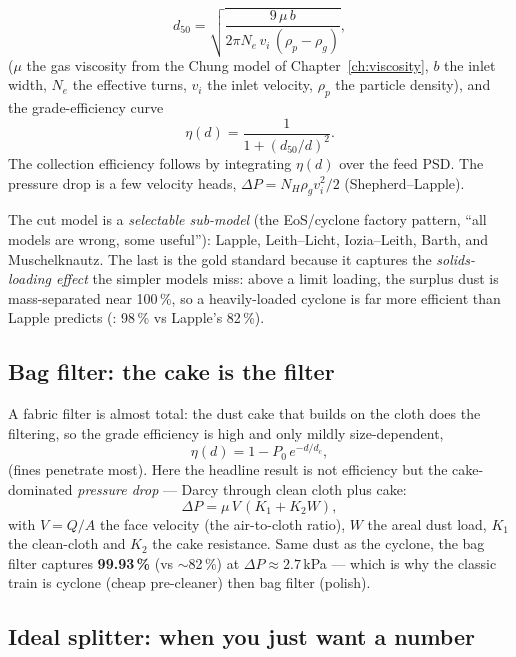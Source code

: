 \documentclass[11pt,a4paper]{article}
\begin{document}
\begin{equation}
   d_{50} = \sqrt{\frac{9\,\mu\,b}{2\pi N_e\, v_i\,(\rho_p - \rho_g)}},
\end{equation}
($\mu$ the gas viscosity from the Chung model of
Chapter~\ref{ch:viscosity}, $b$ the inlet width, $N_e$ the effective
turns, $v_i$ the inlet velocity, $\rho_p$ the particle density), and
the grade-efficiency curve
\begin{equation}
   \eta(d) = \frac{1}{1 + (d_{50}/d)^2}.
\end{equation}
The collection efficiency follows by integrating $\eta(d)$ over the
feed PSD.  The pressure drop is a few velocity heads, $\Delta P = N_H
\rho_g v_i^2/2$ (Shepherd--Lapple).

The cut model is a \emph{selectable sub-model} (the EoS/cyclone factory
pattern, ``all models are wrong, some useful''): Lapple, Leith--Licht,
Iozia--Leith, Barth, and Muschelknautz.  The last is the gold standard
because it captures the \emph{solids-loading effect} the simpler models
miss: above a limit loading, the surplus dust is mass-separated near
100\,\%, so a heavily-loaded cyclone is far more efficient than Lapple
predicts (: 98\,\% vs Lapple's 82\,\%).

\subsection{Bag filter: the cake is the filter}

A fabric filter is almost total: the dust cake that builds on the cloth
does the filtering, so the grade efficiency is high and only mildly
size-dependent,
\begin{equation}
   \eta(d) = 1 - P_0\,e^{-d/d_c},
\end{equation}
(fines penetrate most).  Here the headline result is not efficiency but
the cake-dominated \emph{pressure drop} --- Darcy through clean cloth
plus cake:
\begin{equation}
   \Delta P = \mu\,V\,(K_1 + K_2 W),
\end{equation}
with $V = Q/A$ the face velocity (the air-to-cloth ratio), $W$ the
areal dust load, $K_1$ the clean-cloth and $K_2$ the cake resistance.
Same dust as the cyclone, the bag filter captures \textbf{99.93\,\%}
(vs $\sim$82\,\%) at $\Delta P\approx 2.7$\,kPa --- which is why the
classic train is cyclone (cheap pre-cleaner) then bag filter (polish).

\subsection{Ideal splitter: when you just want a number}
\end{document}
